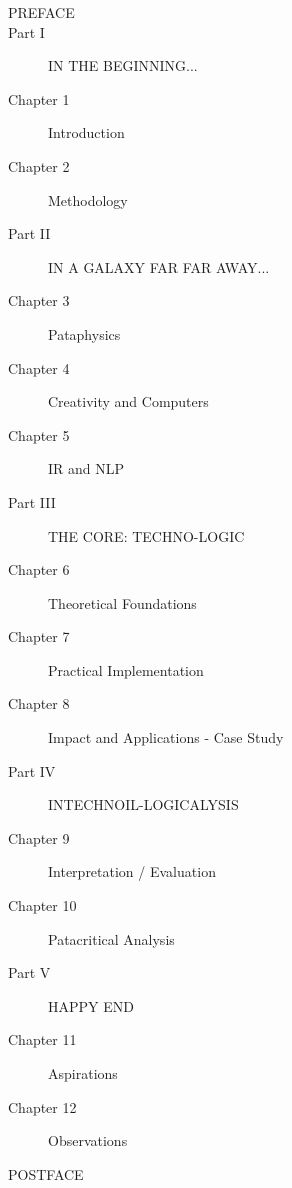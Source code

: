 \begin{description}
  \item[PREFACE]
  \item[Part I] IN THE BEGINNING...
  \item[Chapter 1] Introduction
  \item[Chapter 2] Methodology
  \item[Part II] IN A GALAXY FAR FAR AWAY...
  \item[Chapter 3] Pataphysics
  \item[Chapter 4] Creativity and Computers
  \item[Chapter 5] IR and NLP
  \item[Part III] THE CORE: TECHNO-LOGIC
  \item[Chapter 6] Theoretical Foundations
  \item[Chapter 7] Practical Implementation
  \item[Chapter 8] Impact and Applications - Case Study
  \item[Part IV] INTECHNOIL-LOGICALYSIS
  \item[Chapter 9] Interpretation / Evaluation
  \item[Chapter 10] Patacritical Analysis
  \item[Part V] HAPPY END
  \item[Chapter 11] Aspirations
  \item[Chapter 12] Observations
  \item[POSTFACE]
\end{description}
